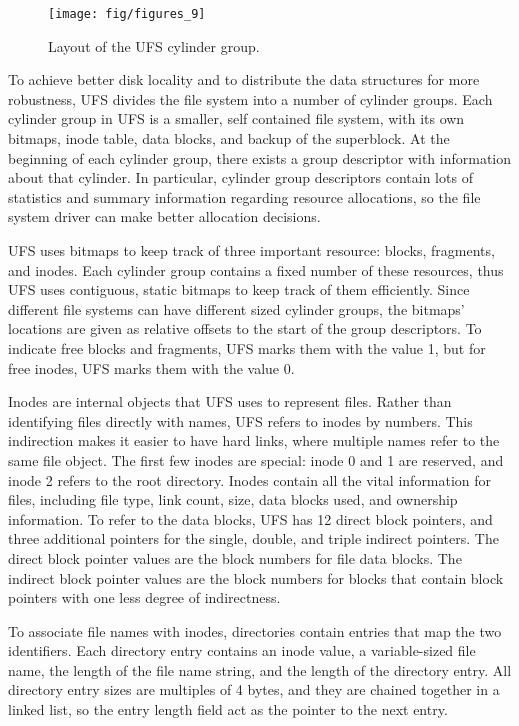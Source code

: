 \begin{figure}[htb]
  \centering
  \texttt{[image: fig/figures\_9]}
  \caption{\label{fig:ufs_cg} Layout of the UFS cylinder group.}
\end{figure}

To achieve better disk locality and to distribute the data structures for
more robustness, UFS divides the file system into a number of cylinder groups.
Each cylinder group in UFS is a smaller, self contained file system, with its
own bitmaps, inode table, data blocks, and backup of the superblock. At the
beginning of each cylinder group, there exists a group descriptor with
information about that cylinder. In particular, cylinder group descriptors
contain lots of statistics and summary information regarding resource
allocations, so the file system driver can make better allocation decisions.

UFS uses bitmaps to keep track of three important resource: blocks, fragments,
and inodes. Each cylinder group contains a fixed number of these resources,
thus UFS uses contiguous, static bitmaps to keep track of them efficiently.
Since different file systems can have different sized cylinder groups, the
bitmaps' locations are given as relative offsets to the start of the group
descriptors. To indicate free blocks and fragments, UFS marks them with the
value 1, but for free inodes, UFS marks them with the value 0.

Inodes are internal objects that UFS uses to represent files. Rather than
identifying files directly with names, UFS refers to inodes by numbers. This
indirection makes it easier to have hard links, where multiple names refer to
the same file object. The first few inodes are special: inode 0 and 1 are
reserved, and inode 2 refers to the root directory. Inodes contain all the
vital information for files, including file type, link count, size, data blocks
used, and ownership information. To refer to the data blocks, UFS has 12 direct
block pointers, and three additional pointers for the single, double, and
triple indirect pointers. The direct block pointer values are the block numbers
for file data blocks. The indirect block pointer values are the block numbers
for blocks that contain block pointers with one less degree of indirectness.

To associate file names with inodes, directories contain entries that map
the two identifiers. Each directory entry contains an inode value, a
variable-sized file name, the length of the file name string, and the length
of the directory entry. All directory entry sizes are multiples of 4 bytes,
and they are chained together in a linked list, so the entry length field act
as the pointer to the next entry.

